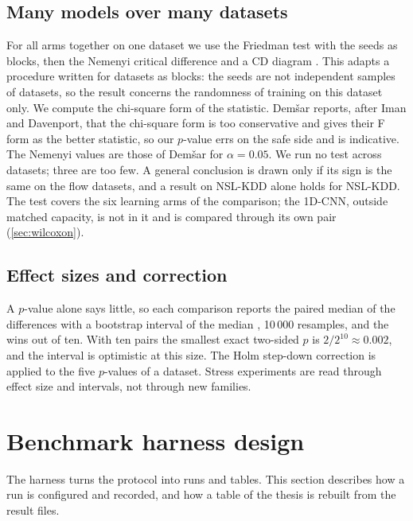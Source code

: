 \subsection{Many models over many datasets}
\label{sec:friedman}

For all arms together on one dataset we use the Friedman test \citep{friedman1937use} with
the seeds as blocks, then the Nemenyi critical difference and a CD diagram
\citep{demsar2006statistical}. This adapts a procedure written for datasets as blocks:
the seeds are not independent samples of datasets, so the result concerns the randomness of
training on this dataset only. We compute the chi-square form of the statistic. Dem{\v{s}}ar reports, after Iman and
Davenport, that the chi-square form is too conservative and gives their F form as the better
statistic, so our $p$-value errs on the safe side and is indicative. The Nemenyi values are those of Dem{\v{s}}ar for
$\alpha=0.05$. We run no test across datasets; three are too few. A general conclusion is
drawn only if its sign is the same on the flow datasets, and a result on NSL-KDD alone holds
for NSL-KDD. The test covers the six learning arms of the comparison; the 1D-CNN, outside
matched capacity, is not in it and is compared through its own pair (\cref{sec:wilcoxon}).

\subsection{Effect sizes and correction}
\label{sec:effect-sizes}

A $p$-value alone says little, so each comparison reports the paired median of the
differences with a bootstrap interval of the median \citep{efron1979bootstrap,efron1994introduction},
10\,000 resamples, and the wins out of ten. With ten pairs the smallest exact two-sided $p$
is $2/2^{10}\approx0.002$, and the interval is optimistic at this size. The Holm step-down
correction \citep{demsar2006statistical} is applied to the five $p$-values of a dataset.
Stress experiments are read through effect size and intervals, not through new families.

\section{Benchmark harness design}
\label{sec:harness}

The harness turns the protocol into runs and tables. This section describes how a run is
configured and recorded, and how a table of the thesis is rebuilt from the result files.

